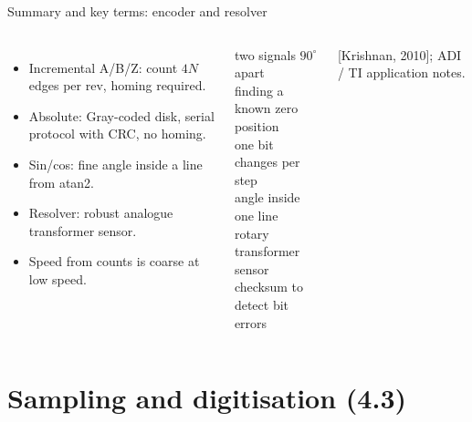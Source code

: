 \documentclass[aspectratio=169,10pt]{beamer}
\begin{document}
\begin{frame}{Summary and key terms: encoder and resolver}
\begin{columns}[T]
\begin{itemize}\small
\item Incremental A/B/Z: count $4N$ edges per rev, homing required.
\item Absolute: Gray-coded disk, serial protocol with CRC, no homing.
\item Sin/cos: fine angle inside a line from atan2.
\item Resolver: robust analogue transformer sensor.
\item Speed from counts is coarse at low speed.
\end{itemize}
\begin{defbox}
\small
{} two signals $90^\circ$ apart\\
 finding a known zero position\\
 one bit changes per step\\
 angle inside one line\\
 rotary transformer sensor\\
 checksum to detect bit errors
\end{defbox}
{\scriptsize\color{mkGray} [Krishnan, 2010]; ADI / TI application notes.}
\end{columns}
\end{frame}

\section{Sampling and digitisation (4.3)}
\end{document}
